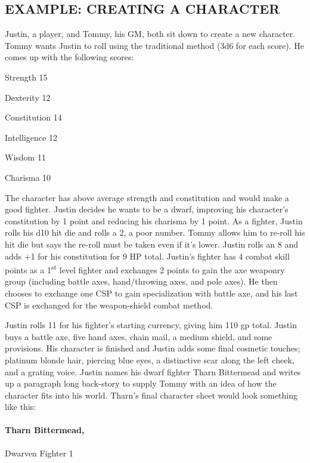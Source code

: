 \begin{multicols}{2}
\begin{minipage}{\columnwidth}
\end{minipage}

\section{EXAMPLE: CREATING A CHARACTER}

Justin, a player, and Tommy, his GM, both sit down to create a new character.  Tommy wants Justin to roll using the traditional method (3d6 for each score).  He comes up with the following scores:

Strength 15

Dexterity 12

Constitution 14

Intelligence 12

Wisdom 11

Charisma 10

The character has above average strength and constitution and would make a good fighter.  Justin decides he wants to be a dwarf, improving his character's constitution by 1 point and reducing his charisma by 1 point.  As a fighter, Justin rolls his d10 hit die and rolls a 2, a poor number.  Tommy allows him to re-roll his hit die but says the re-roll must be taken even if it's lower.  Justin rolls an 8 and adds +1 for his constitution for 9 HP total.  Justin's fighter has 4 combat skill points as a 1\textsuperscript{st} level fighter and exchanges 2 points to gain the axe weaponry group (including battle axes, hand/throwing axes, and pole axes).  He then chooses to exchange one CSP to gain specialization with battle axe, and his last CSP is exchanged for the weapon-shield combat method.

Justin rolls 11 for his fighter's starting currency, giving him 110 gp total.  Justin buys a battle axe, five hand axes, chain mail, a medium shield, and some provisions.  His character is finished and Justin adds some final cosmetic touches; platinum blonde hair, piercing blue eyes, a distinctive scar along the left cheek, and a grating voice.  Justin names his dwarf fighter Tharn Bittermead and writes up a paragraph long back-story to supply Tommy with an idea of how the character fits into his world.  Tharn's final character sheet would look something like this:

\paragraph{Tharn Bittermead,} Dwarven Fighter 1


\end{multicols}
